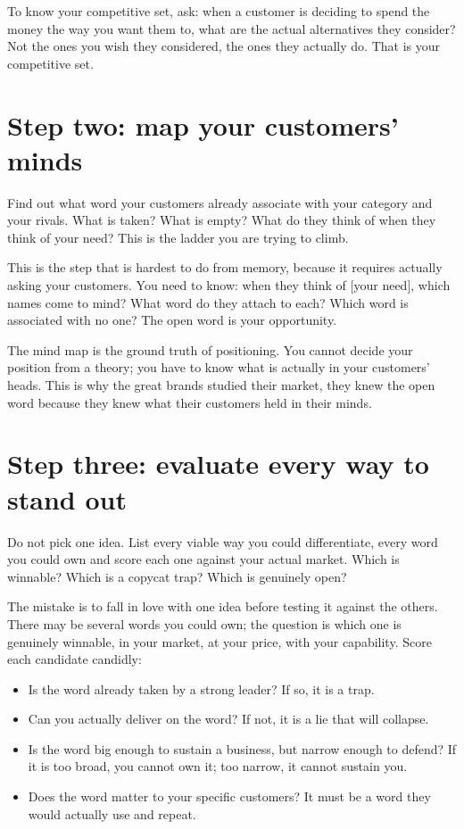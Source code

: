 \documentclass[10pt,twoside,openany]{memoir}
\newcommand{\needspacehead}{\needspace{4\baselineskip}}
\let\oldsection\section
\renewcommand{\section}{\needspacehead\oldsection}
\begin{document}
{To know your competitive set, ask: when a customer is deciding to spend
the money the way you want them to, what are the actual alternatives
they consider? Not the ones you wish they considered, the ones they
actually do. That is your competitive set.

\section{Step two: map your customers'
minds}\label{step-two-map-your-customers-minds}

Find out what word your customers already associate with your category
and your rivals. What is taken? What is empty? What do they think of
when they think of your need? This is the ladder you are trying to
climb.

This is the step that is hardest to do from memory, because it requires
actually asking your customers. You need to know: when they think of
{[}your need{]}, which names come to mind? What word do they attach to
each? Which word is associated with no one? The open word is your
opportunity.

The mind map is the ground truth of positioning. You cannot decide your
position from a theory; you have to know what is actually in your
customers' heads. This is why the great brands studied their market,
they knew the open word because they knew what their customers held in
their minds.

\section{Step three: evaluate every way to stand
out}\label{step-three-evaluate-every-way-to-stand-out-1}

Do not pick one idea. List every viable way you could differentiate,
every word you could own and score each one against your actual market.
Which is winnable? Which is a copycat trap? Which is genuinely open?

The mistake is to fall in love with one idea before testing it against
the others. There may be several words you could own; the question is
which one is genuinely winnable, in your market, at your price, with
your capability. Score each candidate candidly:

\begin{itemize}
\tightlist
\item
  Is the word already taken by a strong leader? If so, it is a trap.
\item
  Can you actually deliver on the word? If not, it is a lie that will
  collapse.
\item
  Is the word big enough to sustain a business, but narrow enough to
  defend? If it is too broad, you cannot own it; too narrow, it cannot
  sustain you.
\item
  Does the word matter to your specific customers? It must be a word
  they would actually use and repeat.
\end{itemize}

}
\end{document}

